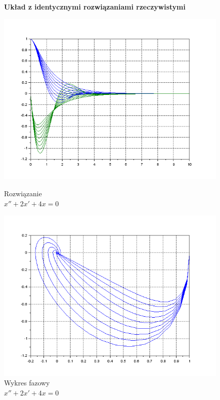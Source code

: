 \documentclass[12pt]{article}
\begin{document}
\begin{figure}[H]
  \centering
  \textbf{Układ z identycznymi rozwiązaniami rzeczywistymi}\par\medskip
  \hspace{-1.6cm}
  \begin{minipage}[b]{0.49\textwidth}
    \includegraphics[scale=0.47]{./img/5-rowne-xy}
    \caption{Rozwiązanie \\ \centering $x''+2x'+4x=0$}
    \label{5-rowne-xy}
  \end{minipage}
  \hfill
  \begin{minipage}[b]{0.49\textwidth}
    \includegraphics[scale=0.47]{./img/5-rowne-phase}
    \caption{Wykres fazowy \\
    \centering $x''+2x'+4x=0$}
    \label{5-rowne-phase}
  \end{minipage}
\end{figure}
\end{document}
